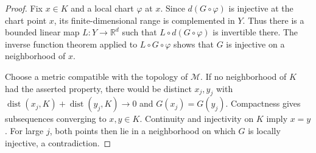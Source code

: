 \documentclass[11pt,oneside]{amsart}
\theoremstyle{plain}
\theoremstyle{definition}
\theoremstyle{remark}
\newcommand{\RR}{\mathbb{R}}
\newcommand{\calM}{\mathcal{M}}
\DeclareMathOperator{\dist}{dist}
\begin{document}
\begin{proof}
Fix $x\in K$ and a local chart $\varphi$ at $x$. Since $d(G\circ\varphi)$ is injective at the chart point $x$, its finite-dimensional range is complemented in $Y$. Thus there is a bounded linear map $L\colon Y\to\RR^d$ such that $L\circ d(G\circ\varphi)$ is invertible there. The inverse function theorem applied to $L\circ G\circ\varphi$ shows that $G$ is injective on a neighborhood of $x$.

Choose a metric compatible with the topology of $\calM$. If no neighborhood of $K$ had the asserted property, there would be distinct $x_j,y_j$ with $\dist(x_j,K)+\dist(y_j,K)\to0$ and $G(x_j)=G(y_j)$. Compactness gives subsequences converging to $x,y\in K$. Continuity and injectivity on $K$ imply $x=y$. For large $j$, both points then lie in a neighborhood on which $G$ is locally injective, a contradiction.
\end{proof}
\end{document}
